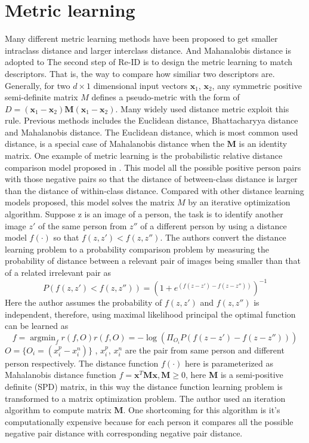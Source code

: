 \section{Metric learning}
Many different metric learning methods have been proposed \cite{KISSME, LFDA, PCCA, TDL, PRDC, LMNN, KLFDA, KCCA, KernelVersionMetrics, NFST, ITML} to get smaller intraclass distance and larger interclass distance. And Mahanalobis distance is adopted to 
The second step of Re-ID is to design the metric learning to match descriptors. That is, the way to compare how similiar two descriptors are. Generally, for two $d\times 1$ dimensional input vectors $\bm{x}_1$, $\bm{x}_2$, any symmetric positive semi-definite matrix $M$ defines a pseudo-metric with the form of $D = (\bm{x}_1 -\bm{x}_2)\bm{M}(\bm{x}_1 - \bm{x}_2)$. Many widely used distance metric exploit this rule. Previous methods includes the Euclidean distance, Bhattacharyya distance and Mahalanobis distance. The Euclidean distance, which is most common used distance, is a special case of Mahalanobis distance when the $\bm{M}$ is an identity matrix. One example of metric learning is the probabilistic relative distance comparison model proposed in \cite{PRDC}. This model  all the possible positive person pairs with those negative pairs so that the distance of between-class distance is larger than the distance of within-class distance. Compared with other distance learning models proposed, this model solves the matrix $M$ by an iterative optimization algorithm. Suppose z is an image of a person, the task is to identify another image $z'$ of the same person from $z''$ of a different person by using a distance model $f(\cdot)$ so that $f(z, z')< f(z, z'')$. The authors convert the distance learning problem to a probability comparison problem by measuring the probability of distance between a relevant pair of images being smaller than that of a related irrelevant pair as
\begin{equation}P(f(z,z')<f(z,z'')) = (1+e^{(f(z-z')-f(z-z''))})^{-1}\end{equation}
Here the author assumes the probability of $f(z,z')$ and $f(z,z'')$ is independent, therefore, using maximal likelihood principal the optimal function can be learned as
\begin{equation}
f = \mathop{\arg\min}_f r(f,O) 
r(f,O) = -\log(\Pi_{O_i}P(f(z-z')-f(z-z'')))
\end{equation}
$O=\{O_i=(x_i^p-x_i^n)\}$ , $x_i^p$, $x_i^n$ are the pair from same person and different person respectively.
The distance function $f(\cdot)$ here is parameterized as Mahalanobis distance function
$f=\bm{x}^T\bm{M}\bm{x},\bm{M\ge}0$,
here \textbf{M} is a semi-positive definite (SPD) matrix, in this way the distance function learning problem is transformed to a matrix optimization problem. The author used an iteration algorithm to compute matrix $\bm{M}$. One shortcoming for this algorithm is it's computationally expensive because for each person it compares all the possible negative pair distance with corresponding negative pair distance. 


